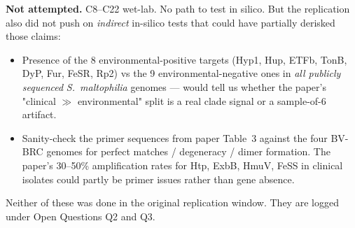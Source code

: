 \documentclass[10pt,a4paper]{article}
\begin{document}
\textbf{Not attempted.} C8--C22 wet-lab. No path to test in silico. But the
replication also did not push on \textit{indirect} in-silico tests that could
have partially derisked those claims:
\begin{itemize}[leftmargin=1.4em,itemsep=1pt]
  \item Presence of the 8 environmental-positive targets (Hyp1, Hup, ETFb,
        TonB, DyP, Fur, FeSR, Rp2) vs the 9 environmental-negative ones in
        \emph{all publicly sequenced} \textit{S.\ maltophilia} genomes ---
        would tell us whether the paper's "clinical $\gg$ environmental" split
        is a real clade signal or a sample-of-6 artifact.
  \item Sanity-check the primer sequences from paper Table~3 against the four
        BV-BRC genomes for perfect matches / degeneracy / dimer formation.
        The paper's 30--50\% amplification rates for Htp, ExbB, HmuV, FeSS in
        clinical isolates could partly be primer issues rather than gene
        absence.
\end{itemize}
Neither of these was done in the original replication window. They are logged
under Open Questions Q2 and Q3.
\end{document}
